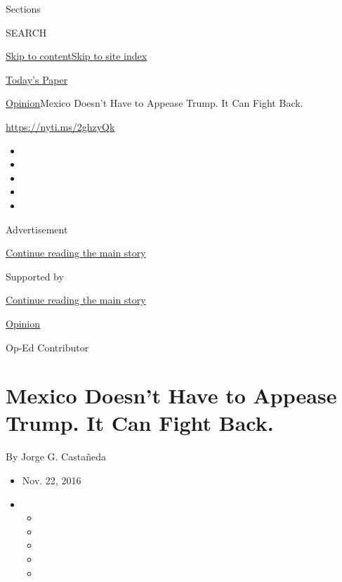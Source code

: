 Sections

SEARCH

\protect\hyperlink{site-content}{Skip to
content}\protect\hyperlink{site-index}{Skip to site index}

\href{https://myaccount.nytimes3xbfgragh.onion/auth/login?response_type=cookie\&client_id=vi}{}

\href{https://www.nytimes3xbfgragh.onion/section/todayspaper}{Today's
Paper}

\href{/section/opinion}{Opinion}\textbar{}Mexico Doesn't Have to Appease
Trump. It Can Fight Back.

\url{https://nyti.ms/2ghzyQk}

\begin{itemize}
\item
\item
\item
\item
\item
\end{itemize}

Advertisement

\protect\hyperlink{after-top}{Continue reading the main story}

Supported by

\protect\hyperlink{after-sponsor}{Continue reading the main story}

\href{/section/opinion}{Opinion}

Op-Ed Contributor

\hypertarget{mexico-doesnt-have-to-appease-trump-it-can-fight-back}{%
\section{Mexico Doesn't Have to Appease Trump. It Can Fight
Back.}\label{mexico-doesnt-have-to-appease-trump-it-can-fight-back}}

By Jorge G. Castañeda

\begin{itemize}
\item
  Nov. 22, 2016
\item
  \begin{itemize}
  \item
  \item
  \item
  \item
  \item
  \end{itemize}
\end{itemize}


